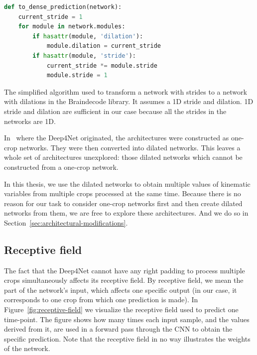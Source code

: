 \begin{algorithm}
\begin{lstlisting}[language=Python, label={lst:lstlisting}]
def to_dense_prediction(network):
	current_stride = 1
	for module in network.modules:
		if hasattr(module, 'dilation'):
			module.dilation = current_stride
		if hasattr(module, 'stride'):
			current_stride *= module.stride
			module.stride = 1
\end{lstlisting}
\caption{The simplified algorithm used to transform a network with strides to a network with dilations in the Braindecode library.
It assumes a 1D stride and dilation. 1D stride and dilation are sufficient in our case because all the strides in the networks are 1D.
}
\label{alg:stride-to-dilation}
\end{algorithm}


In~\cite{schirrmeister-deep-2017} where the Deep4Net originated, the architectures were constructed as one-crop networks. They were then converted into dilated networks.
This leaves a whole set of architectures unexplored: those dilated networks which cannot be constructed from a one-crop network.

In this thesis, we use the dilated networks to obtain multiple values of kinematic variables from multiple crops processed at the same time. 
Because there is no reason for our task to consider one-crop networks first and then create dilated networks from them, we are free to explore these architectures.
And we do so in Section~\ref{sec:architectural-modifications}.

\subsection{Receptive field}\label{subsec:receptive-field}
The fact that the Deep4Net cannot have any right padding to process multiple crops simultaneously affects its receptive field.
By receptive field, we mean the part of the network's input, which affects one specific output (in our case, it corresponds to one crop from which one prediction is made).
In Figure~\ref{fig:receptive-field} we visualize the receptive field used to predict one time-point.
The figure shows how many times each input sample, and the values derived from it, are used in a forward pass through the CNN to obtain the specific prediction.
Note that the receptive field in no way illustrates the weights of the network.


